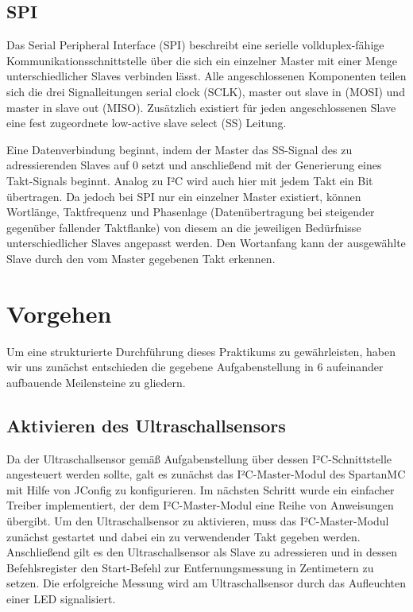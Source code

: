 \documentclass[parskip,
							 oneside,
							 11pt,
							 noheadingspace,
							 accentcolor=tud1d,
							 bigchapter,
							 colorback]{tudreport}
\begin{document}
\section{SPI}

Das Serial Peripheral Interface (SPI) beschreibt eine serielle vollduplex-fähige Kommunikationsschnittstelle über die sich ein einzelner Master mit einer Menge unterschiedlicher Slaves verbinden lässt. Alle angeschlossenen Komponenten teilen sich die drei Signalleitungen serial clock (SCLK), master out slave in (MOSI) und master in slave out (MISO). Zusätzlich existiert für jeden angeschlossenen Slave eine fest zugeordnete low-active slave select (SS) Leitung.

Eine Datenverbindung beginnt, indem der Master das SS-Signal des zu adressierenden Slaves auf 0 setzt und anschließend mit der Generierung eines Takt-Signals beginnt. Analog zu I²C wird auch hier mit jedem Takt ein Bit übertragen. Da jedoch bei SPI nur ein einzelner Master existiert, können Wortlänge, Taktfrequenz und Phasenlage (Datenübertragung bei steigender gegenüber fallender Taktflanke) von diesem an die jeweiligen Bedürfnisse unterschiedlicher Slaves angepasst werden. Den Wortanfang kann der ausgewählte Slave durch den vom Master gegebenen Takt erkennen. 

\chapter{Vorgehen}

Um eine strukturierte Durchführung dieses Praktikums zu gewährleisten, haben wir uns zunächst entschieden die gegebene Aufgabenstellung in 6 aufeinander aufbauende Meilensteine zu gliedern.

\section{Aktivieren des Ultraschallsensors}

Da der Ultraschallsensor gemäß Aufgabenstellung über dessen I²C-Schnittstelle angesteuert werden sollte, galt es zunächst das I²C-Master-Modul des SpartanMC mit Hilfe von JConfig zu konfigurieren. Im nächsten Schritt wurde ein einfacher Treiber implementiert, der dem I²C-Master-Modul eine Reihe von Anweisungen übergibt. Um den Ultraschallsensor zu aktivieren, muss das I²C-Master-Modul zunächst gestartet und dabei ein zu verwendender Takt gegeben werden. Anschließend gilt es den Ultraschallsensor als Slave zu adressieren und in dessen Befehlsregister den Start-Befehl zur Entfernungsmessung in Zentimetern zu setzen. Die erfolgreiche Messung wird am Ultraschallsensor durch das Aufleuchten einer LED signalisiert.
\end{document}
